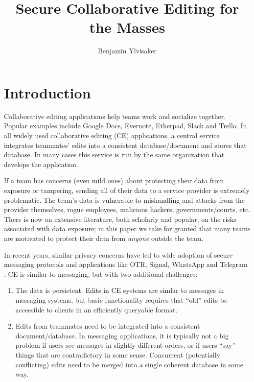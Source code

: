 \documentclass{article}
\begin{document}
\title{Secure Collaborative Editing for the Masses}
\author{Benjamin Ylvisaker}

\maketitle

\section{Introduction}

Collaborative editing applications help teams work and socialize together.
Popular examples include Google Docs, Evernote, Etherpad, Slack and Trello.
In all widely used collaborative editing (CE) applications, a central service integrates teammates' edits into a consistent database/document and stores that database.
In many cases this service is run by the same organization that develops the application.

If a team has concerns (even mild ones) about protecting their data from exposure or tampering, sending all of their data to a service provider is extremely problematic.
The team's data is vulnerable to mishandling and attacks from the provider themselves, rogue employees, malicious hackers, governments/courts, etc.
There is now an extensive literature, both scholarly and popular, on the risks associated with data exposure; in this paper we take for granted that many teams are motivated to protect their data from \emph{anyone} outside the team.

In recent years, similar privacy concerns have led to wide adoption of secure messaging protocols and applications like OTR, Signal, WhatsApp and Telegram \cite{}.
CE is similar to messaging, but with two additional challenges:
\begin{enumerate}
\item The data is persistent.
  Edits in CE systems are simlar to messages in messaging systems, but basic functionality requires that ``old'' edits be accessible to clients in an efficiently queryable format.
\item Edits from teammates need to be integrated into a consistent document{\slash}database.
  In messaging applications, it is typically not a big problem if users see messages in slightly different orders, or if users ``say'' things that are contradictory in some sense.
  Concurrent (potentially conflicting) edits need to be merged into a single coherent database in some way.
\end{enumerate}
\end{document}
